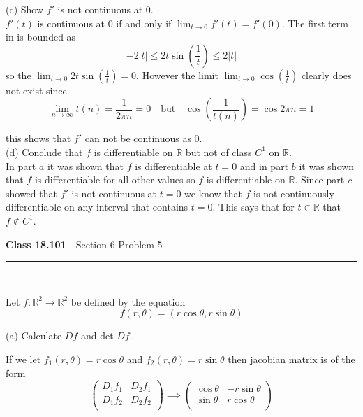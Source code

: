 \documentclass[11pt,reqno]{article}
\begin{document}
\noindent (c) Show $f'$ is not continuous at 0.\\

$f'(t)$ is continuous at 0 if and only if $\lim_{t \to 0} f'(t) = f'(0)$. The first term in is bounded as 
\[ -2|t| \le 2t \sin( \frac{1}{t} ) \le 2|t| \]
so the $\lim_{t \to 0} 2t \sin( \frac{1}{t} ) = 0$. However the limit $\lim_{t \to 0} \cos (\frac{1}{t})$ clearly does not exist since 
\[ \lim_{n \to \infty} t(n) = \frac{1}{2 \pi n} = 0 \quad \text{but} \quad \cos(\frac{1}{t(n)}) = \cos 2 \pi n = 1 \]

\noindent this shows that $f'$ can not be continuous as 0.\\

\noindent (d) Conclude that $f$ is differentiable on $\mathbb{R}$ but not of class $C^1$ on $\mathbb{R}$.\\

In part $a$ it was shown that $f$ is differentiable at $t = 0$ and in part $b$ it was shown that $f$ is differentiable for all other values so $f$ is differentiable on $\mathbb{R}$. Since part $c$ showed that $f'$ is not continuous at $t = 0$ we know that $f$ is not continuously differentiable on any interval that contains $t = 0$. This says that for $t \in \mathbb{R}$ that $f \notin C^1$.

\begin{flushleft} 
\textbf{Class 18.101} - Section 6 Problem 5\\
\rule{500pt}{1pt}\\
\end{flushleft} 

\noindent Let $f: \mathbb{R}^2 \to \mathbb{R}^2$ be defined by the equation
\[ f(r,\theta) = (r \cos \theta, r \sin \theta) \]

\noindent (a) Calculate $D f$ and det $D f$.

\noindent If we let $f_1(r,\theta) = r \cos \theta$ and $f_2(r,\theta) = r \sin \theta$ then jacobian matrix is of the form
\[ 
\left( \begin{array}{cc}
D_1 f_1 & D_2 f_1 \\
D_1 f_2 & D_2 f_2  \\
\end{array} \right)
\implies 
\left( \begin{array}{cc}
\cos \theta & -r \sin \theta \\
\sin \theta & r \cos \theta  \\
\end{array} \right)
\]
\end{document}
